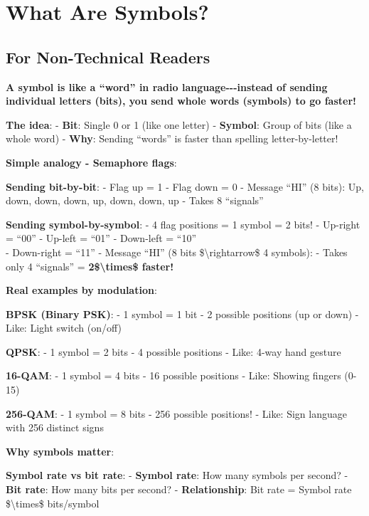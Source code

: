 \section{What Are Symbols?}\label{what-are-symbols}

\subsection{\texorpdfstring{ For Non-Technical
Readers}{ For Non-Technical Readers}}\label{for-non-technical-readers}

\textbf{A symbol is like a ``word'' in radio language-\/-\/-instead of
sending individual letters (bits), you send whole words (symbols) to go
faster!}

\textbf{The idea}: - \textbf{Bit}: Single 0 or 1 (like one letter) -
\textbf{Symbol}: Group of bits (like a whole word) - \textbf{Why}:
Sending ``words'' is faster than spelling letter-by-letter!

\textbf{Simple analogy - Semaphore flags}:

\textbf{Sending bit-by-bit}: - Flag up = 1 - Flag down = 0 - Message
``HI'' (8 bits): Up, down, down, down, up, down, down, up - Takes 8
``signals''

\textbf{Sending symbol-by-symbol}: - 4 flag positions = 1 symbol = 2
bits! - Up-right = ``00'' - Up-left = ``01'' - Down-left = ``10''\\
- Down-right = ``11'' - Message ``HI'' (8 bits
\$\textbackslash rightarrow\$ 4 symbols): - Takes only 4 ``signals'' =
\textbf{2\$\textbackslash times\$ faster!}

\textbf{Real examples by modulation}:

\textbf{BPSK (Binary PSK)}: - 1 symbol = 1 bit - 2 possible positions
(up or down) - Like: Light switch (on/off)

\textbf{QPSK}: - 1 symbol = 2 bits - 4 possible positions - Like: 4-way
hand gesture

\textbf{16-QAM}: - 1 symbol = 4 bits - 16 possible positions - Like:
Showing fingers (0-15)

\textbf{256-QAM}: - 1 symbol = 8 bits - 256 possible positions! - Like:
Sign language with 256 distinct signs

\textbf{Why symbols matter}:

\textbf{Symbol rate vs bit rate}: - \textbf{Symbol rate}: How many
symbols per second? - \textbf{Bit rate}: How many bits per second? -
\textbf{Relationship}: Bit rate = Symbol rate \$\textbackslash times\$
bits/symbol

